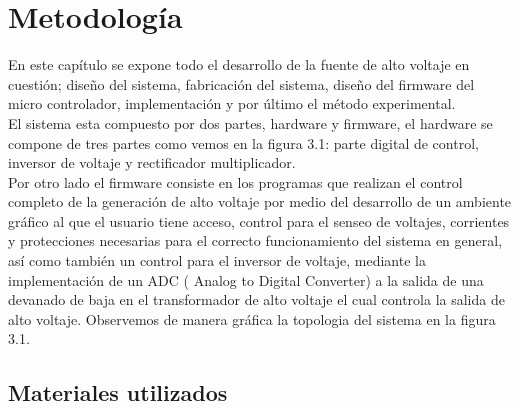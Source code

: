 



\chapter{Metodología}
En este capítulo se expone todo el desarrollo de la fuente de alto voltaje en cuestión; diseño del sistema, fabricación del sistema, diseño del firmware del micro controlador, implementación y por último el método experimental.\\

El sistema esta compuesto por dos partes, hardware y firmware, el hardware se compone de tres partes como vemos en la figura 3.1: parte digital de control, inversor de voltaje y rectificador multiplicador. \\

Por otro lado el firmware consiste en los programas que realizan el control completo de la generación de alto voltaje por medio del desarrollo de un ambiente gráfico al que el usuario tiene acceso,  control para el senseo de voltajes, corrientes y protecciones necesarias para el correcto funcionamiento del sistema en general, así como también un control para el inversor de voltaje, mediante la implementación de un ADC ( Analog to Digital Converter) a la salida de una devanado de baja en el transformador de alto voltaje el cual controla la salida de alto voltaje. Observemos de manera gráfica la topologia del sistema en la figura 3.1. 
\newpage





\section{Materiales utilizados}


